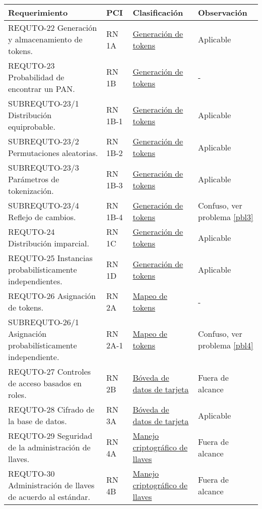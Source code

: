 \begin{table}[H]
  \centering
  \begin{tabular}{| p{5.5cm} | p{2cm} | p{4cm} | p{4cm} |}

    \hline
      \textbf{Requerimiento}    &
      \textbf{PCI}              &
      \textbf{Clasificación}    &
      \textbf{Observación}     \\ [0.8ex]
    \hline

    REQUTO-22 Generación y almacenamiento de tokens.  
    &  RN 1A    &  \hyperref[dm:gen_tokens]{Generación de tokens}              &  Aplicable        \\ \hline
    REQUTO-23 Probabilidad de encontrar un PAN.  
    &  RN 1B    &  \hyperref[dm:gen_tokens]{Generación de tokens}              &  -                \\ \hline
    SUBREQUTO-23/1 Distribución equiprobable.  
    &  RN 1B-1  &  \hyperref[dm:gen_tokens]{Generación de tokens}              &  Aplicable        \\ \hline
    SUBREQUTO-23/2 Permutaciones aleatorias.  
    &  RN 1B-2  &  \hyperref[dm:gen_tokens]{Generación de tokens}              &  Aplicable        \\ \hline
    SUBREQUTO-23/3 Parámetros de tokenización.  
    &  RN 1B-3  &  \hyperref[dm:gen_tokens]{Generación de tokens}              &  Aplicable        \\ \hline
    SUBREQUTO-23/4 Reflejo de cambios.  
    &  RN 1B-4  &  \hyperref[dm:gen_tokens]{Generación de tokens}              &  Confuso, ver problema \ref{pbl3}  \\ \hline
    REQUTO-24 Distribución imparcial.  
    &  RN 1C    &  \hyperref[dm:gen_tokens]{Generación de tokens}              &  Aplicable        \\ \hline
    REQUTO-25 Instancias probabilísticamente independientes.  
    &  RN 1D    &  \hyperref[dm:gen_tokens]{Generación de tokens}              &  Aplicable        \\ \hline
    REQUTO-26 Asignación de tokens.  
    &  RN 2A    &  \hyperref[dm:mapeo_tokens]{Mapeo de tokens}                 &  -                \\ \hline
    SUBREQUTO-26/1 Asignación probabilísticamente independiente.  
    &  RN 2A-1  &  \hyperref[dm:mapeo_tokens]{Mapeo de tokens}                 &  Confuso, ver problema \ref{pbl4}  \\ \hline
    REQUTO-27 Controles de acceso basados en roles.  
    &  RN 2B    &  \hyperref[dm:card_data]{Bóveda de datos de tarjeta}         &  Fuera de alcance \\ \hline
    REQUTO-28 Cifrado de la base de datos.  
    &  RN 3A    &  \hyperref[dm:card_data]{Bóveda de datos de tarjeta}         &  Aplicable        \\ \hline
    REQUTO-29 Seguridad de la administración de llaves.  
    &  RN 4A    &  \hyperref[dm:man_llaves]{Manejo criptográfico de llaves}    &  Fuera de alcance \\ \hline
    REQUTO-30 Administración de llaves de acuerdo al estándar.  
    &  RN 4B    &  \hyperref[dm:man_llaves]{Manejo criptográfico de llaves}    &  Fuera de alcance \\ \hline


\end{tabular}
\end{table}

